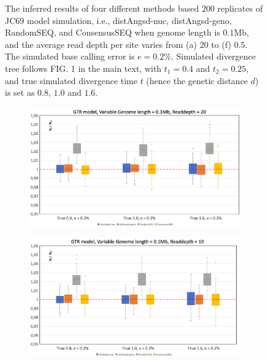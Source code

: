 \documentclass{article}
\begin{document}
\begin{figure}[h]
\begin{subfigure}[b]{0.475\textwidth}
         \caption{}
         \label{fig:JCRD05_01Mb}
    \end{subfigure}
    \vspace{0.5cm}
    \caption{The inferred results of four different methods based $200$ replicates of JC69 model simulation, i.e., distAngsd-nuc, distAngsd-geno, RandomSEQ, and ConsensusSEQ when genome length is $0.1$Mb, and the average read depth per site varies from (a) $20$ to (f) $0.5$. The simulated base calling error is $e =0.2\%$. Simulated divergence tree follows FIG. 1 in the main text, with $t_1=0.4$ and $t_2 = 0.25$, and true simulated divergence time $t$ (hence the genetic distance $d$) is set as $0.8$, $1.0$ and $1.6$.}
    \label{fig:JC01Mb}
\end{figure}

\begin{figure}[h]
    \centering
        \begin{subfigure}[b]{0.475\textwidth}
         \centering
         \includegraphics[width=\textwidth]{GTRRD20_01Mb.png}
         \caption{}
         \label{fig:GTRRD20_01Mb}
     \end{subfigure}
     \begin{subfigure}[b]{0.475\textwidth}
         \centering
         \includegraphics[width=\textwidth]{GTRRD10_01Mb.png}

\end{subfigure}
\end{figure}
\end{document}
